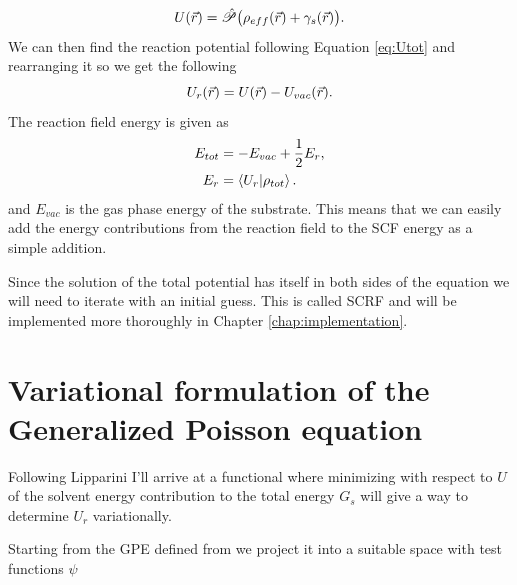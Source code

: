 \documentclass[../master_thesis.tex]{subfiles}
\begin{document}
\begin{equation}
  U(\vec{r}) = \hat{\mathscr{P}}\big( \rho_{eff}(\vec{r}) + \gamma_s(\vec{r})\big).
\end{equation}
We can then find the reaction potential following Equation \ref{eq:Utot} and
rearranging it so we get the following
\begin{equation}
  U_r(\vec{r}) = U(\vec{r}) - U_{vac}(\vec{r}).
\end{equation}
The reaction field energy is given as \cite{FossoTande:2013ka}
\begin{align}
  E_{tot} &= - E_{vac} + \frac{1}{2}E_r, \\
  E_r &= \braket{U_r | \rho_{tot}}.
\end{align}
and $E_{vac}$ is the gas phase energy of the substrate. This means that we
can easily add the energy contributions from the reaction field to the \ac{SCF} energy
as a simple addition.

Since the solution of
the total potential has itself in both sides of the
equation we will need to iterate with an initial guess. This is called \ac{SCRF}
and will be implemented more thoroughly in Chapter \ref{chap:implementation}.

\section{Variational formulation of the Generalized Poisson equation}
Following Lipparini \cite{Lipparini:2010bg, Lipparini:2013} I'll arrive at a functional where
minimizing with respect to $U$ of the solvent energy contribution to
the total energy $G_s$ will give a way to determine $U_r$ variationally.

Starting from the \ac{GPE} defined from \cite{FossoTande:2013ka} we project it
into a suitable space with test functions $\psi$
\end{document}
